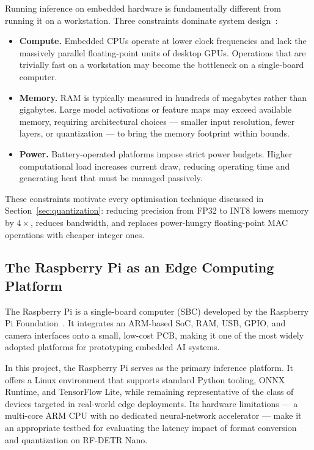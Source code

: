 Running inference on embedded hardware is fundamentally different from
running it on a workstation. Three constraints dominate system
design~\cite{warden2019tinyml}:
 
\begin{itemize}
    \item \textbf{Compute.} Embedded CPUs operate at lower clock
          frequencies and lack the massively parallel floating-point
          units of desktop GPUs. Operations that are trivially fast on
          a workstation may become the bottleneck on a single-board
          computer.
 
    \item \textbf{Memory.} RAM is typically measured in hundreds of
          megabytes rather than gigabytes. Large model activations or
          feature maps may exceed available memory, requiring
          architectural choices — smaller input resolution,
          fewer layers, or quantization — to bring the memory
          footprint within bounds.
 
    \item \textbf{Power.} Battery-operated platforms impose strict
          power budgets. Higher computational load increases current
          draw, reducing operating time and generating heat that
          must be managed passively.
\end{itemize}
 
These constraints motivate every optimisation technique discussed in
Section~\ref{sec:quantization}: reducing precision from FP32 to INT8
lowers memory by $4\times$, reduces bandwidth, and replaces
power-hungry floating-point MAC operations with cheaper integer ones.
 
\subsection{The Raspberry Pi as an Edge Computing Platform}
 
The Raspberry Pi is a single-board computer (SBC) developed by the
Raspberry Pi Foundation~\cite{upton2016raspberry}. It integrates an
ARM-based SoC, RAM, USB, GPIO, and camera interfaces onto a small,
low-cost PCB, making it one of the most widely adopted platforms for
prototyping embedded AI systems.
 
In this project, the Raspberry Pi serves as the primary inference
platform. It offers a Linux environment that supports standard Python
tooling, ONNX Runtime, and TensorFlow Lite, while remaining
representative of the class of devices targeted in real-world
edge deployments. Its hardware limitations — a multi-core ARM CPU
with no dedicated neural-network accelerator — make it an appropriate
testbed for evaluating the latency impact of format conversion and
quantization on RF-DETR Nano.



